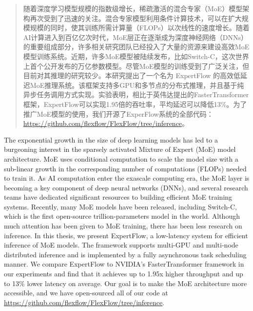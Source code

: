 

\begin{abstract}
  随着深度学习模型规模的指数级增长，稀疏激活的混合专家（MoE）模型架构再次受到了迅速的关注。混合专家模型利用条件计算技术，可以在扩大规模规模的同时，使其训练所需计算量（FLOPs）以次线性的速度增长。随着AI计算进入到百亿亿次时代，MoE层正在逐渐成为深度神经网络（DNNs）的重要组成部分，许多相关研究团队已经投入了大量的资源来建设高效MoE模型训练系统。近期，许多MoE模型被陆续发布，比如Switch-C，这次世界上首个公开发布的万亿参数模型。尽管MoE模型的训练受到了广泛关注，但目前对其推理的研究较少。本研究提出了一个名为 ExpertFlow 的高效低延迟MoE推理系统。该框架支持多GPU和多节点的分布式推理，并且基于纯异步任务调用方式实现。实验表明，相比于英伟达提出的FasterTransformer框架，ExpertFlow可以实现1.95倍的吞吐率，平均延迟可以降低13\%。为了推广MoE模型的使用，我们开源了ExperFlow系统的全部代码：\url{https://github.com/flexflow/FlexFlow/tree/inference}。

\end{abstract}

\begin{abstract*}
  The exponential growth in the size of deep learning models has led to a burgeoning interest in the sparsely activated Mixture of Expert (MoE) model architecture. MoE uses conditional computation to scale the model size with a sub-linear growth in the corresponding number of computations (FLOPs) needed to train it. As AI computation enter the exascale computing era, the MoE layer is becoming a key component of deep neural networks (DNNs), and several research teams have dedicated significant resources to building eﬀicient MoE training systems. Recently, many MoE models have been released, including Switch-C, which is the first open-source trillion-parameters model in the world.
Although much attention has been given to MoE training, there has been less research on inference. In this thesis, we present ExpertFlow, a low-latency system for eﬀicient inference of MoE models. The framework supports multi-GPU and multi-node distributed inference and is implemented by a fully asynchronous task scheduling manner. We compare ExpertFlow to NVIDIA’s FasterTransformer framework in our experiments and find that it achieves up to 1.95x higher throughput and up to 13\% lower latency on average.
Our goal is to make the MoE architecture more accessible, and we have open-sourced all of our code at \url{https://github.com/flexflow/FlexFlow/tree/inference}.

\end{abstract*}
